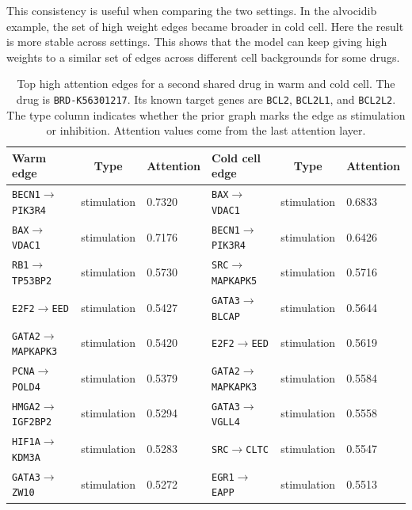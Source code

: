 \noindent This consistency is useful when comparing the two settings. In the alvocidib example, the set of high weight edges became broader in cold cell. Here the result is more stable across settings. This shows that the model can keep giving high weights to a similar set of edges across different cell backgrounds for some drugs. 

\begin{table}[htbp]
\centering
\caption[Second Shared Drug Edges]{Top high attention edges for a second shared drug in warm and cold cell. The drug is \texttt{BRD-K56301217}. Its known target genes are \texttt{BCL2}, \texttt{BCL2L1}, and \texttt{BCL2L2}. The type column indicates whether the prior graph marks the edge as stimulation or inhibition. Attention values come from the last attention layer.}
\label{tab:attention_shared_drug_warm_cold_cell_abt737}
\begin{tabular}{lcllcl}
\hline
Warm edge & Type & Attention & Cold cell edge & Type & Attention \\
\hline
\texttt{BECN1}$\rightarrow$\texttt{PIK3R4} & stimulation & 0.7320 & \texttt{BAX}$\rightarrow$\texttt{VDAC1} & stimulation & 0.6833 \\
\texttt{BAX}$\rightarrow$\texttt{VDAC1} & stimulation & 0.7176 & \texttt{BECN1}$\rightarrow$\texttt{PIK3R4} & stimulation & 0.6426 \\
\texttt{RB1}$\rightarrow$\texttt{TP53BP2} & stimulation & 0.5730 & \texttt{SRC}$\rightarrow$\texttt{MAPKAPK5} & stimulation & 0.5716 \\
\texttt{E2F2}$\rightarrow$\texttt{EED} & stimulation & 0.5427 & \texttt{GATA3}$\rightarrow$\texttt{BLCAP} & stimulation & 0.5644 \\
\texttt{GATA2}$\rightarrow$\texttt{MAPKAPK3} & stimulation & 0.5420 & \texttt{E2F2}$\rightarrow$\texttt{EED} & stimulation & 0.5619 \\
\texttt{PCNA}$\rightarrow$\texttt{POLD4} & stimulation & 0.5379 & \texttt{GATA2}$\rightarrow$\texttt{MAPKAPK3} & stimulation & 0.5584 \\
\texttt{HMGA2}$\rightarrow$\texttt{IGF2BP2} & stimulation & 0.5294 & \texttt{GATA3}$\rightarrow$\texttt{VGLL4} & stimulation & 0.5558 \\
\texttt{HIF1A}$\rightarrow$\texttt{KDM3A} & stimulation & 0.5283 & \texttt{SRC}$\rightarrow$\texttt{CLTC} & stimulation & 0.5547 \\
\texttt{GATA3}$\rightarrow$\texttt{ZW10} & stimulation & 0.5272 & \texttt{EGR1}$\rightarrow$\texttt{EAPP} & stimulation & 0.5513 \\

\end{tabular}
\end{table}
